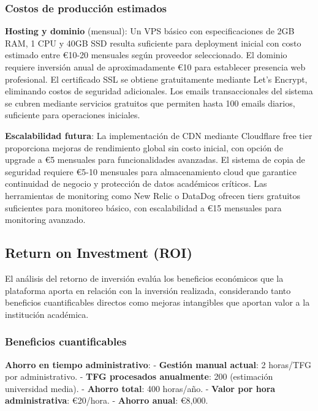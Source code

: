 \documentclass[12pt,a4paper,oneside]{report}
\begin{document}
\subsubsection{Costos de producción
estimados}\label{costos-de-producciuxf3n-estimados}

\textbf{Hosting y dominio} (mensual): Un VPS básico con especificaciones de 2GB RAM, 1 CPU y 40GB SSD resulta suficiente para deployment inicial con costo estimado entre €10-20 mensuales según proveedor seleccionado. El dominio requiere inversión anual de aproximadamente €10 para establecer presencia web profesional. El certificado SSL se obtiene gratuitamente mediante Let's Encrypt, eliminando costos de seguridad adicionales. Los emails transaccionales del sistema se cubren mediante servicios gratuitos que permiten hasta 100 emails diarios, suficiente para operaciones iniciales.

\textbf{Escalabilidad futura}: La implementación de CDN mediante Cloudflare free tier proporciona mejoras de rendimiento global sin costo inicial, con opción de upgrade a €5 mensuales para funcionalidades avanzadas. El sistema de copia de seguridad requiere €5-10 mensuales para almacenamiento cloud que garantice continuidad de negocio y protección de datos académicos críticos. Las herramientas de monitoring como New Relic o DataDog ofrecen tiers gratuitos suficientes para monitoreo básico, con escalabilidad a €15 mensuales para monitoring avanzado.

\subsection{Return on Investment (ROI)}\label{return-on-investment-roi}

El análisis del retorno de inversión evalúa los beneficios económicos que la plataforma aporta en relación con la inversión realizada, considerando tanto beneficios cuantificables directos como mejoras intangibles que aportan valor a la institución académica.

\subsubsection{Beneficios
cuantificables}\label{beneficios-cuantificables}

\textbf{Ahorro en tiempo administrativo}: - \textbf{Gestión manual
actual}: 2 horas/TFG por administrativo. - \textbf{TFG procesados
anualmente}: 200 (estimación universidad media). - \textbf{Ahorro
total}: 400 horas/año. - \textbf{Valor por hora administrativa}:
€20/hora. - \textbf{Ahorro anual}: €8,000.
\end{document}
